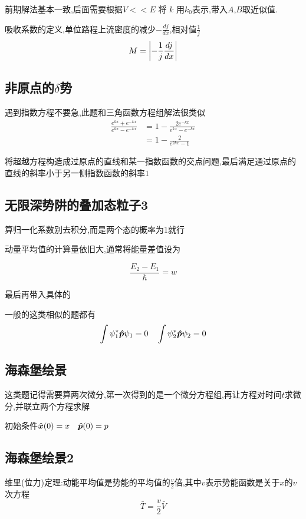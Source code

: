 \documentclass{article}
\begin{document}
            前期解法基本一致,后面需要根据$ V << E$ 将 $ k $ 用$ k_{0} $表示,带入$A$,$B$取近似值.

            吸收系数的定义,单位路程上流密度的减少$ -\frac{dj}{dx} $,相对值$ \frac{1}{j} $
            $$ M = \abs{ - \frac{1}{j} \frac{dj}{dx}} $$

        \subsection{非原点的\texorpdfstring{$\delta$}{}势}

            遇到指数方程不要急,此题和三角函数方程组解法很类似
            \begin{align*}
                \frac{e^{kx} + e^{-kx}}{e^{kx} - e^{-kx}} &= 1 - \frac{2e^{-kx}}{e^{kx} - e^{-kx}} \\
                                                          &= 1 - \frac{2}{e^{2kx} - 1}
            \end{align*}
            
            将超越方程构造成过原点的直线和某一指数函数的交点问题,最后满足通过原点的直线的斜率小于另一侧指数函数的斜率$1$

        \subsection{无限深势阱的叠加态粒子3}
            算归一化系数别去积分,而是两个态的概率为1就行

            动量平均值的计算量依旧大,通常将能量差值设为

            $$ \frac{E_{2} - E_{1}}{\hbar} = w $$    
        
            最后再带入具体的

            一般的这类相似的题都有
            $$ \int \psi_{1}^{*} \vu*{p} \psi_{1} = 0 \quad \int \psi_{2}^{*} \vu*{p} \psi_{2} = 0 $$

        \subsection{海森堡绘景}
            这类题记得需要算两次微分,第一次得到的是一个微分方程组,再让方程对时间$t$求微分,并联立两个方程求解
        
            初始条件$ \vu*{x}(0) = x \quad \vu*{p}(0) = p $

        \subsection{海森堡绘景2}
            \begin{thm}\label{thm:1.3}
                \thmindent

                维里(位力)定理:动能平均值是势能的平均值的$\frac{v}{2}$倍,其中$v$表示势能函数是关于$x$的$v$次方程
                $$ \bar{T} = \frac{v}{2} \bar{V} $$ 

            \end{thm}
\end{document}
